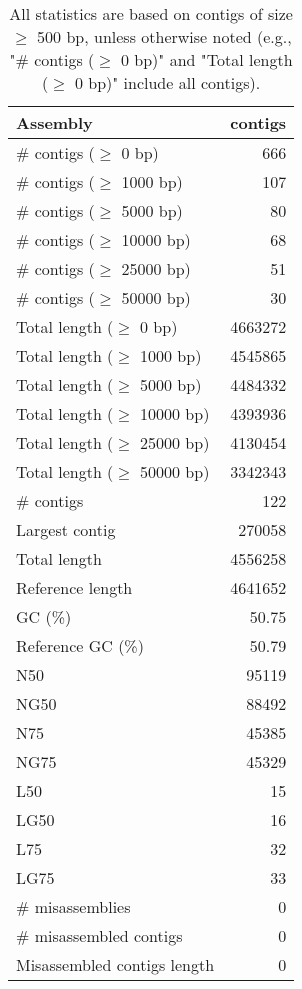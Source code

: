 \documentclass[12pt,a4paper]{article}
\begin{document}
\begin{table}[ht]
\begin{center}
\caption{All statistics are based on contigs of size $\geq$ 500 bp, unless otherwise noted (e.g., "\# contigs ($\geq$ 0 bp)" and "Total length ($\geq$ 0 bp)" include all contigs).}
\begin{tabular}{|l*{1}{|r}|}
\hline
Assembly & contigs \\ \hline
\# contigs ($\geq$ 0 bp) & 666 \\ \hline
\# contigs ($\geq$ 1000 bp) & 107 \\ \hline
\# contigs ($\geq$ 5000 bp) & 80 \\ \hline
\# contigs ($\geq$ 10000 bp) & 68 \\ \hline
\# contigs ($\geq$ 25000 bp) & 51 \\ \hline
\# contigs ($\geq$ 50000 bp) & 30 \\ \hline
Total length ($\geq$ 0 bp) & 4663272 \\ \hline
Total length ($\geq$ 1000 bp) & 4545865 \\ \hline
Total length ($\geq$ 5000 bp) & 4484332 \\ \hline
Total length ($\geq$ 10000 bp) & 4393936 \\ \hline
Total length ($\geq$ 25000 bp) & 4130454 \\ \hline
Total length ($\geq$ 50000 bp) & 3342343 \\ \hline
\# contigs & 122 \\ \hline
Largest contig & 270058 \\ \hline
Total length & 4556258 \\ \hline
Reference length & 4641652 \\ \hline
GC (\%) & 50.75 \\ \hline
Reference GC (\%) & 50.79 \\ \hline
N50 & 95119 \\ \hline
NG50 & 88492 \\ \hline
N75 & 45385 \\ \hline
NG75 & 45329 \\ \hline
L50 & 15 \\ \hline
LG50 & 16 \\ \hline
L75 & 32 \\ \hline
LG75 & 33 \\ \hline
\# misassemblies & 0 \\ \hline
\# misassembled contigs & 0 \\ \hline
Misassembled contigs length & 0 \\ \hline

\end{tabular}
\end{center}
\end{table}
\end{document}
